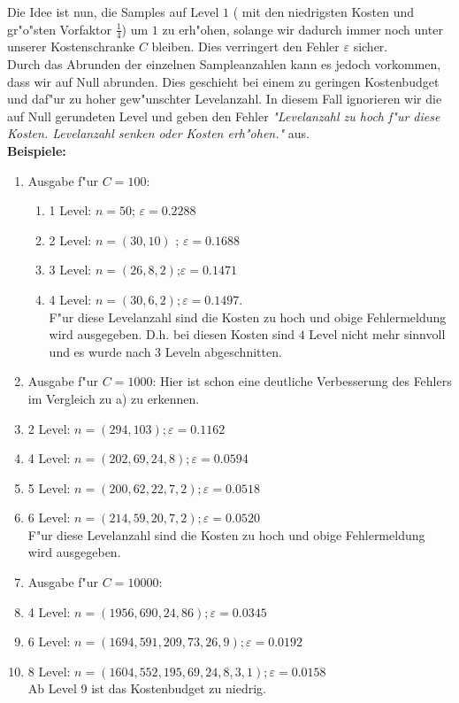 Die Idee ist nun, die Samples auf Level $1$ ( mit den niedrigsten Kosten und gr"o"sten Vorfaktor $\frac{1}{4}$) um $1$ zu erh"ohen, solange  wir dadurch immer noch unter unserer Kostenschranke $C$ bleiben. Dies verringert den Fehler $\varepsilon$ sicher.\\
Durch das Abrunden der einzelnen Sampleanzahlen kann es jedoch vorkommen, dass wir auf Null abrunden. Dies geschieht bei einem zu geringen Kostenbudget und daf"ur zu hoher gew"unschter Levelanzahl. In diesem Fall ignorieren wir die auf Null gerundeten Level
und geben den Fehler \textit{"Levelanzahl zu hoch f"ur diese Kosten. Levelanzahl senken oder Kosten erh"ohen."} aus.\\[0,2cm]
\textbf{Beispiele:}
\begin{enumerate}
\item[a)] Ausgabe f"ur $C=100$:
\begin{enumerate}
\item[-]1 Level: $n=50$; $\varepsilon=0.2288$
\item[-]2 Level: $n=(30,10)$ ; $\varepsilon=0.1688$
\item[-]3 Level: $n=(26,8,2)$;$\varepsilon=0.1471$
\item[-]4 Level: 
 $n=( 30,6,2);\varepsilon= 0.1497$.\\
F"ur diese Levelanzahl sind die Kosten zu hoch und obige Fehlermeldung wird ausgegeben. 
D.h. bei diesen Kosten sind $4$ Level nicht mehr sinnvoll und es wurde nach 3 Leveln abgeschnitten.
\end{enumerate}
\item[b)] Ausgabe f"ur $C=1000$:  Hier ist schon eine deutliche Verbesserung des Fehlers im Vergleich zu a) zu erkennen.

\item[-]2 Level: $n=(294,103); \varepsilon= 0.1162$
\item[-]4 Level: $n=(202,69,24, 8);\varepsilon= 0.0594$
\item[-]5 Level: $n=(200,62,22,7,2);\varepsilon=0.0518$
\item[-]6 Level: $n=(214,59,20,7,2);\varepsilon=0.0520$\\
F"ur diese Levelanzahl sind die Kosten zu hoch und obige Fehlermeldung wird ausgegeben. 
\item[c)] Ausgabe f"ur $C=10000$:
\item[-]4 Level: $n=(1956,690,24,86);\varepsilon=0.0345$
\item[-]6 Level: $n=(1694,591,209,73,26,9);\varepsilon= 0.0192$
\item[-]8 Level: $n=(1604,552,195,69,24,8,3,1);\varepsilon=0.0158$\\
Ab Level 9 ist das Kostenbudget zu niedrig.
\end{enumerate}
